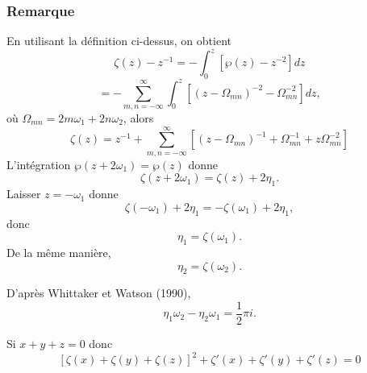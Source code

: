 \documentclass[12pt]{article}
\begin{document}
                        \newpage
                        \subsubsection{Remarque}
                        En utilisant la définition ci-dessus, on obtient
                        \[
                        \zeta (z) - z^{-1} = - \int_{0}^{z} \left[ \wp (z) - z^{-2} \right] dz \tag{3}
                        \]
                        \[
                        = - \sum_{m,n=-\infty}^{\infty} \int_{0}^{z} \left[ (z - \Omega_{mn})^{-2} - \Omega_{mn}^{-2} \right] dz, \tag{4}
                        \]
                        où $\Omega_{mn} = 2 m \omega_1 + 2 n \omega_2$, alors
                        \[
                        \zeta (z) = z^{-1} + \sum_{m,n=-\infty}^{\infty} \left[ (z - \Omega_{mn})^{-1} + \Omega_{mn}^{-1} + z \Omega_{mn}^{-2} \right] \tag{5}
                        \]
                        L'intégration $\wp (z + 2 \omega_1) = \wp (z)$ donne
                        \[
                        \zeta (z + 2 \omega_1) = \zeta (z) + 2 \eta_1. \tag{6}
                        \]
                        Laisser $z = -\omega_1$ donne
                        \[
                        \zeta (-\omega_1) + 2 \eta_1 = -\zeta (\omega_1) + 2 \eta_1, \tag{7}
                        \]
                        donc
                        \[
                        \eta_1 = \zeta (\omega_1). \tag{8}
                        \]
                        De la même manière,
                        \[
                        \eta_2 = \zeta (\omega_2). \tag{9}
                        \]
                        
                        D'après Whittaker et Watson (1990),
                        \[
                        \eta_1 \omega_2 - \eta_2 \omega_1 = \frac{1}{2} \pi i. \tag{10}
                        \]
                        
                        Si $x + y + z = 0$ donc
                        \[
                        \left[ \zeta (x) + \zeta (y) + \zeta (z) \right]^2 + \zeta' (x) + \zeta' (y) + \zeta' (z) = 0 \tag{11}
                        \]
                        
\end{document}
